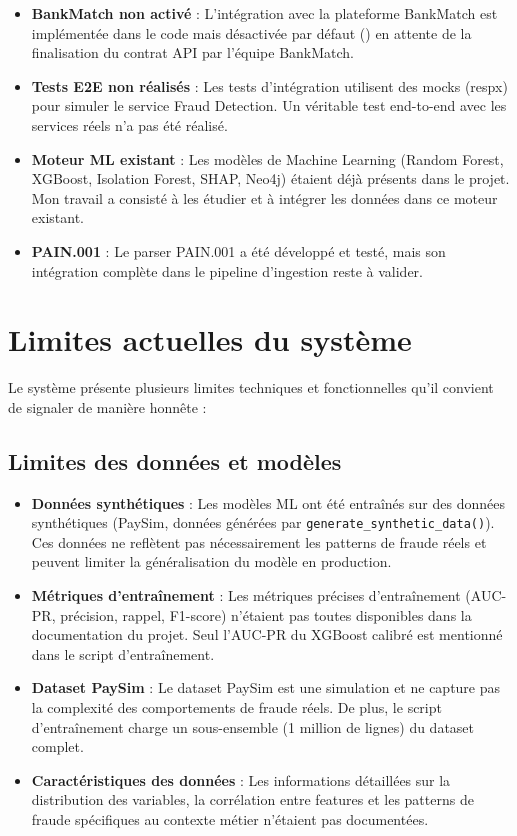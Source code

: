 \documentclass[12pt,a4paper]{extreport}
\begin{document}
\begin{itemize}
    \item \textbf{BankMatch non activé} : L'intégration avec la plateforme BankMatch est implémentée dans le code mais désactivée par défaut () en attente de la finalisation du contrat API par l'équipe BankMatch.
    \item \textbf{Tests E2E non réalisés} : Les tests d'intégration utilisent des mocks (respx) pour simuler le service Fraud Detection. Un véritable test end-to-end avec les services réels n'a pas été réalisé.
    \item \textbf{Moteur ML existant} : Les modèles de Machine Learning (Random Forest, XGBoost, Isolation Forest, SHAP, Neo4j) étaient déjà présents dans le projet. Mon travail a consisté à les étudier et à intégrer les données dans ce moteur existant.
    \item \textbf{PAIN.001} : Le parser PAIN.001 a été développé et testé, mais son intégration complète dans le pipeline d'ingestion reste à valider.
\end{itemize}

\section{Limites actuelles du système}

Le système présente plusieurs limites techniques et fonctionnelles qu'il convient de signaler de manière honnête :

\subsection{Limites des données et modèles}

\begin{itemize}
    \item \textbf{Données synthétiques} : Les modèles ML ont été entraînés sur des données synthétiques (PaySim, données générées par \texttt{generate\_synthetic\_data()}). Ces données ne reflètent pas nécessairement les patterns de fraude réels et peuvent limiter la généralisation du modèle en production.
    \item \textbf{Métriques d'entraînement} : Les métriques précises d'entraînement (AUC-PR, précision, rappel, F1-score) n'étaient pas toutes disponibles dans la documentation du projet. Seul l'AUC-PR du XGBoost calibré est mentionné dans le script d'entraînement.
    \item \textbf{Dataset PaySim} : Le dataset PaySim est une simulation et ne capture pas la complexité des comportements de fraude réels. De plus, le script d'entraînement charge un sous-ensemble (1 million de lignes) du dataset complet.
    \item \textbf{Caractéristiques des données} : Les informations détaillées sur la distribution des variables, la corrélation entre features et les patterns de fraude spécifiques au contexte métier n'étaient pas documentées.
\end{itemize}
\end{document}
